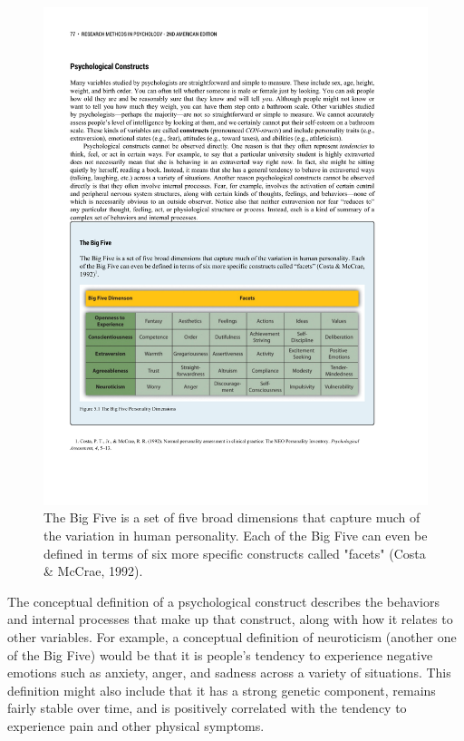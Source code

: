 \begin{figure}
      \includegraphics[width=\linewidth]{figures/C5bigfive.pdf}
      \caption{The Big Five is a set of five broad dimensions that capture much of the variation in human personality. Each of the Big Five can even be defined in terms of six more specific constructs called "facets" (Costa \& McCrae, 1992).
}
      \label{fig:bigfive}
\end{figure}


The conceptual definition of a psychological construct describes the behaviors and internal processes that make up that construct, along with how it relates to other variables. For example, a conceptual definition of neuroticism (another one of the Big Five) would be that it is people's tendency to experience negative emotions such as anxiety, anger, and sadness across a variety of situations. This definition might also include that it has a strong genetic component, remains fairly stable over time, and is positively correlated with the tendency to experience pain and other physical symptoms.

